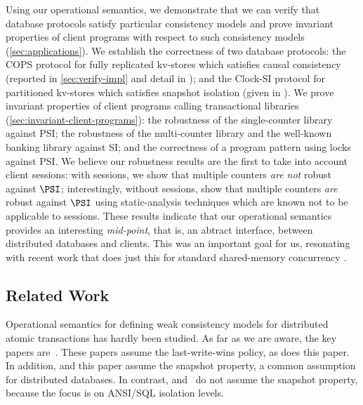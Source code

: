 Using our operational semantics, we demonstrate that we can verify
that database protocols satisfy particular consistency models and
prove invariant properties of client programs with respect to such
consistency models (\cref{sec:applications}).
We establish the correctness of two database
protocols: the COPS protocol for  fully replicated kv-stores \cite{cops} 
which satisfies causal consistency (reported in \cref{sec:verify-impl}
and detail in \cite{shale-phd}); 
and the Clock-SI protocol for partitioned kv-stores \cite{clocksi} 
which satisfies snapshot isolation (given in \cite{shale-phd}). 
We prove invariant properties of client programs calling
transactional libraries (\cref{sec:invariant-client-programs}): the robustness of the single-counter library
against PSI;  the robustness of the multi-counter library and the
well-known banking library \cite{bank-example-wsi} against SI; and the
correctness of a program pattern using locks against PSI. 
We believe our robustness results are the first to take into account client
sessions: with sessions, we show that multiple counters {\em are not} robust against \(\PSI\);
interestingly, without sessions, \citet{giovanni_concur16} show that multiple counters \emph{are}
robust against \(\PSI\) using static-analysis techniques which are
known not to be applicable to sessions.  
These results indicate that  our operational semantics provides an interesting \emph{mid-point},
that is, an abtract interface,
between distributed databases and clients.
This was an important goal for us, resonating with recent work
that does just this for standard shared-memory concurrency \cite{tada,cap,iris,fcsl}. 



\subsection{Related Work} 
\label{sec:newrelated}

Operational semantics for defining weak consistency models for
distributed atomic transactions has hardly been
studied. As far as we are aware, the key papers are~\cite{seebelieve,sureshConcur,alonetogether}. These papers
assume the last-write-wins policy, as does this paper. In addition,
\cite{sureshConcur} and this paper assume the snapshot property, a
common assumption for distributed databases. In contrast,
\cite{seebelieve} and~\cite{ alonetogether} do not assume the
snapshot property, because the focus is on ANSI/SQL isolation levels.



